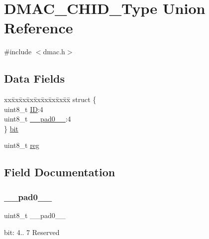 \hypertarget{union_d_m_a_c___c_h_i_d___type}{}\section{D\+M\+A\+C\+\_\+\+C\+H\+I\+D\+\_\+\+Type Union Reference}
\label{union_d_m_a_c___c_h_i_d___type}


{\ttfamily \#include $<$dmac.\+h$>$}

\subsection*{Data Fields}
\begin{DoxyCompactItemize}
\item 
\begin{tabbing}
xx\=xx\=xx\=xx\=xx\=xx\=xx\=xx\=xx\=\kill
struct \{\\
\>uint8\_t \mbox{\hyperlink{union_d_m_a_c___c_h_i_d___type_ae05e4021c05cb62085215a5b3d03c0bc}{ID}}:4\\
\>uint8\_t \mbox{\hyperlink{union_d_m_a_c___c_h_i_d___type_a8b4eebe79ded0459acec2f4950102ba3}{\_\_pad0\_\_}}:4\\
\} \mbox{\hyperlink{union_d_m_a_c___c_h_i_d___type_ae511cbbc56e46590a66166b974e0d235}{bit}}\\

\end{tabbing}\item 
uint8\+\_\+t \mbox{\hyperlink{union_d_m_a_c___c_h_i_d___type_a9428adc9af4653a2050e2536b55dec8d}{reg}}
\end{DoxyCompactItemize}


\subsection{Field Documentation}
\mbox{\label{union_d_m_a_c___c_h_i_d___type_a8b4eebe79ded0459acec2f4950102ba3}} 
\subsubsection{\texorpdfstring{\_\_pad0\_\_}{\_\_pad0\_\_}}
{\footnotesize\ttfamily uint8\+\_\+t \+\_\+\+\_\+pad0\+\_\+\+\_\+}

bit\+: 4.. 7 Reserved \mbox{\label{union_d_m_a_c___c_h_i_d___type_ae511cbbc56e46590a66166b974e0d235}} 
